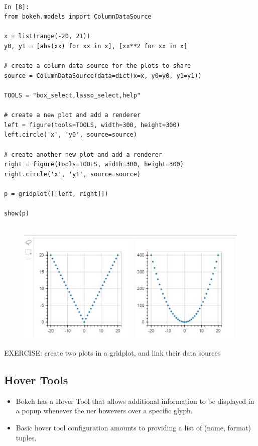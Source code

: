 \documentclass[a4paper,12pt]{article}
\begin{document}
\begin{framed}
	\begin{verbatim}
	
In [8]:
from bokeh.models import ColumnDataSource

x = list(range(-20, 21))
y0, y1 = [abs(xx) for xx in x], [xx**2 for xx in x]

# create a column data source for the plots to share
source = ColumnDataSource(data=dict(x=x, y0=y0, y1=y1))

TOOLS = "box_select,lasso_select,help"

# create a new plot and add a renderer
left = figure(tools=TOOLS, width=300, height=300)
left.circle('x', 'y0', source=source)

# create another new plot and add a renderer
right = figure(tools=TOOLS, width=300, height=300)
right.circle('x', 'y1', source=source)

p = gridplot([[left, right]])

show(p)
 
\end{verbatim}
\end{framed}
\begin{figure}[h!]
	\centering
	\includegraphics[width=0.7\linewidth]{images/06-interactions-tut-04}
\end{figure}

EXERCISE: create two plots in a gridplot, and link their data sources

\newpage
\subsection{Hover Tools}
\begin{itemize}
\item Bokeh has a Hover Tool that allows additional information to be displayed in a popup whenever the uer howevers over a specific glyph. 
\item Basic hover tool configuration amounts to providing a list of (name, format) tuples. 
\end{itemize}
\end{document}
